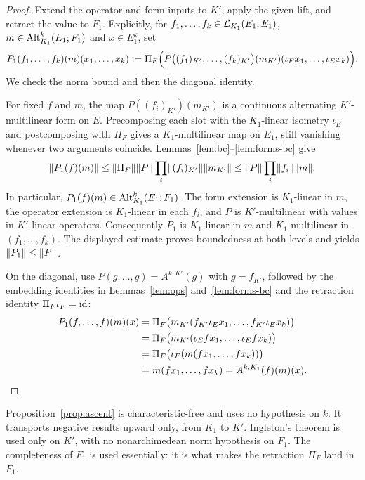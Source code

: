 \begin{proof}
Extend the operator and form inputs to $K'$, apply the given lift, and retract the value to $F_1$. Explicitly,
for $f_1,\dots,f_k\in\mathcal L_{K_1}(E_1,E_1)$, $m\in\operatorname{Alt}^k_{K_1}(E_1;F_1)$ and $x\in E_1^k$, set
\[
P_1(f_1,\dots,f_k)(m)(x_1,\dots,x_k):=
\Pi_F\Bigl(P\bigl((f_1)_{K'},\dots,(f_k)_{K'}\bigr)(m_{K'})(\iota_Ex_1,\dots,\iota_Ex_k)\Bigr).
\]
We check the norm bound and then the diagonal identity.

For fixed $f$ and $m$, the map $P((f_i)_{K'})(m_{K'})$ is a continuous alternating $K'$\nobreakdash-multilinear form
on $E$. Precomposing each slot with the $K_1$\nobreakdash-linear isometry $\iota_E$ and postcomposing with
$\Pi_F$ gives a $K_1$\nobreakdash-multilinear map on $E_1$, still vanishing whenever two arguments coincide.
Lemmas~\ref{lem:bc}--\ref{lem:forms-bc} give
\[
\lVert P_1(f)(m)\rVert
\le\lVert \Pi_F\rVert\lVert P\rVert\prod_i\lVert (f_i)_{K'}\rVert\lVert m_{K'}\rVert
\le\lVert P\rVert\prod_i\lVert f_i\rVert\lVert m\rVert.
\]
In particular, $P_1(f)(m)\in\operatorname{Alt}^k_{K_1}(E_1;F_1)$.
The form extension is $K_1$\nobreakdash-linear in $m$, the operator extension is $K_1$\nobreakdash-linear in each
$f_i$, and $P$ is $K'$\nobreakdash-multilinear with values in $K'$\nobreakdash-linear operators.
Consequently $P_1$ is $K_1$\nobreakdash-linear in $m$ and $K_1$\nobreakdash-multilinear in $(f_1,\dots,f_k)$.
The displayed estimate proves boundedness at both levels and yields $\lVert P_1\rVert\le\lVert P\rVert$.

On the diagonal, use $P(g,\dots,g)=A^{k,K'}(g)$ with $g=f_{K'}$, followed by the embedding identities in
Lemmas~\ref{lem:ops} and~\ref{lem:forms-bc} and the retraction identity $\Pi_F\iota_F=\mathrm{id}$:
\begin{align*}
P_1(f,\dots,f)(m)(x)
&=\Pi_F\bigl(m_{K'}(f_{K'}\iota_Ex_1,\dots,f_{K'}\iota_Ex_k)\bigr)\\
&=\Pi_F\bigl(m_{K'}(\iota_Efx_1,\dots,\iota_Efx_k)\bigr)\\
&=\Pi_F\bigl(\iota_F(m(fx_1,\dots,fx_k))\bigr)\\
&=m(fx_1,\dots,fx_k)=A^{k,K_1}(f)(m)(x).\qedhere
\end{align*}
\end{proof}

\begin{remark}\label{rem:ascent}
Proposition~\ref{prop:ascent} is characteristic-free and uses no hypothesis on $k$. It transports negative results
upward only, from $K_1$ to $K'$. Ingleton's theorem is used only on $K'$, with no nonarchimedean norm hypothesis on $F_1$. The completeness of $F_1$ is used essentially: it is what makes the retraction $\Pi_F$ land in $F_1$.
\end{remark}

